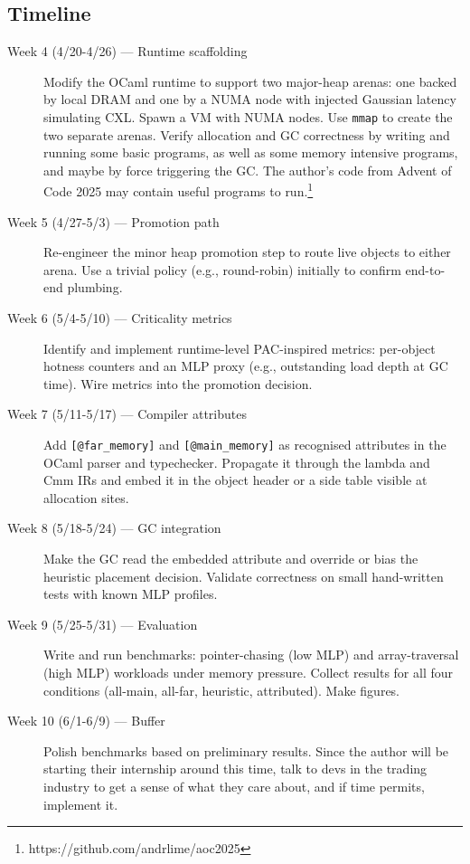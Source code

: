 \documentclass[sigconf]{acmart}
\begin{document}
\subsection{Timeline}
\begin{description}
  \item[Week 4 (4/20-4/26) --- Runtime scaffolding] Modify the OCaml runtime to support two major-heap arenas: one backed by local DRAM and one by a NUMA node with injected Gaussian latency simulating CXL. Spawn a VM with NUMA nodes. Use \texttt{mmap} to create the two separate arenas. Verify allocation and GC correctness by writing and running some basic programs, as well as some memory intensive programs, and maybe by force triggering the GC. The author's code from Advent of Code 2025 may contain useful programs to run.\footnote{https://github.com/andrlime/aoc2025}
  \item[Week 5 (4/27-5/3) --- Promotion path] Re-engineer the minor heap promotion step to route live objects to either arena. Use a trivial policy (e.g., round-robin) initially to confirm end-to-end plumbing.
  \item[Week 6 (5/4-5/10) --- Criticality metrics] Identify and implement runtime-level PAC-inspired metrics: per-object hotness counters and an MLP proxy (e.g., outstanding load depth at GC time). Wire metrics into the promotion decision.
  \item[Week 7 (5/11-5/17) --- Compiler attributes] Add \texttt{[@far\_memory]} and \texttt{[@main\_memory]} as recognised attributes in the OCaml parser and typechecker. Propagate it through the lambda and Cmm IRs and embed it in the object header or a side table visible at allocation sites.
  \item[Week 8 (5/18-5/24) --- GC integration] Make the GC read the embedded attribute and override or bias the heuristic placement decision. Validate correctness on small hand-written tests with known MLP profiles.
  \item[Week 9 (5/25-5/31) --- Evaluation] Write and run benchmarks: pointer-chasing (low MLP) and array-traversal (high MLP) workloads under memory pressure. Collect results for all four conditions (all-main, all-far, heuristic, attributed). Make figures.
  \item[Week 10 (6/1-6/9) --- Buffer] Polish benchmarks based on preliminary results. Since the author will be starting their internship around this time, talk to devs in the trading industry to get a sense of what they care about, and if time permits, implement it.
\end{description}
\end{document}
